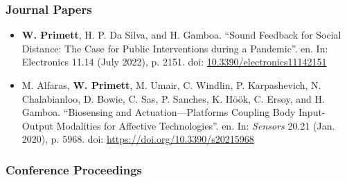 \subsubsection{Journal Papers}

\begin{itemize}


    \item \textbf{W. Primett}, H. P. Da Silva, and H. Gamboa. “Sound Feedback for Social Distance: The Case for Public Interventions during a Pandemic”. en. In: Electronics 11.14
    (July 2022), p. 2151. doi: \url{10.3390/electronics11142151}

    \item M. Alfaras, \textbf{W. Primett}, M. Umair, C. Windlin, P. Karpashevich, N. Chalabianloo,
    D. Bowie, C. Sas, P. Sanches, K. Höök, C. Ersoy, and H. Gamboa. “Biosensing
    and Actuation—Platforms Coupling Body Input-Output Modalities for Affective
    Technologies”. en. In: \textit{Sensors} 20.21 (Jan. 2020), p. 5968. doi: \url{https://doi.org/10.3390/s20215968}
\end{itemize}

\subsubsection{Conference Proceedings}

